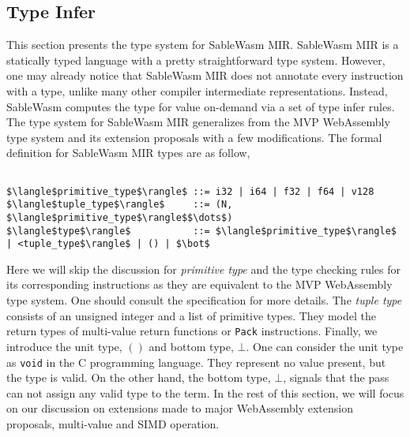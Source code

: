 \subsection{Type Infer}

This section presents the type system for SableWasm MIR. SableWasm MIR is a statically typed language with a pretty straightforward type system. However, one may already notice that SableWasm MIR does not annotate every instruction with a type, unlike many other compiler intermediate representations. Instead, SableWasm computes the type for value on-demand via a set of type infer rules. The type system for SableWasm MIR generalizes from the MVP WebAssembly type system and its extension proposals with a few modifications. The formal definition for SableWasm MIR types are as follow,

\begin{lstlisting}[basicstyle=\linespread{1}\ttfamily, mathescape=true]

$\langle$primitive_type$\rangle$ ::= i32 | i64 | f32 | f64 | v128
$\langle$tuple_type$\rangle$     ::= (N, $\langle$primitive_type$\rangle$$\dots$)
$\langle$type$\rangle$           ::= $\langle$primitive_type$\rangle$ | <tuple_type$\rangle$ | () | $\bot$

\end{lstlisting}

Here we will skip the discussion for \emph{primitive type} and the type checking rules for its corresponding instructions as they are equivalent to the MVP WebAssembly type system. One should consult the specification for more details. The \emph{tuple type} consists of an unsigned integer and a list of primitive types. They model the return types of multi-value return functions or \texttt{Pack} instructions. Finally, we introduce the unit type, $()$ and bottom type, $\bot$. One can consider the unit type as \texttt{void} in the C programming language. They represent no value present, but the type is valid. On the other hand, the bottom type, $\bot$, signals that the pass can not assign any valid type to the term. In the rest of this section, we will focus on our discussion on extensions made to major WebAssembly extension proposals, multi-value and SIMD operation.

